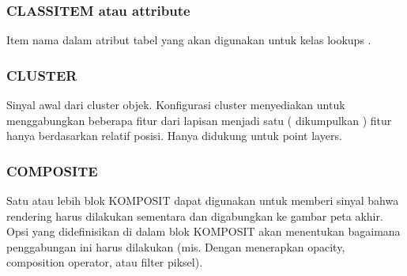   \subsubsection{CLASSITEM atau attribute}
  Item nama dalam atribut tabel yang akan digunakan untuk kelas lookups .
  \subsubsection{CLUSTER}
  Sinyal awal dari cluster objek. Konfigurasi cluster menyediakan untuk menggabungkan beberapa fitur dari lapisan menjadi satu ( dikumpulkan ) fitur  hanya berdasarkan relatif posisi. Hanya didukung untuk point layers.
  \subsubsection{COMPOSITE}
  Satu atau lebih blok KOMPOSIT dapat digunakan untuk memberi sinyal bahwa rendering harus dilakukan sementara dan digabungkan ke gambar peta akhir. 
  Opsi yang didefinisikan di dalam blok KOMPOSIT akan menentukan bagaimana penggabungan ini harus dilakukan (mis. Dengan menerapkan opacity, composition operator, atau filter piksel).
  

